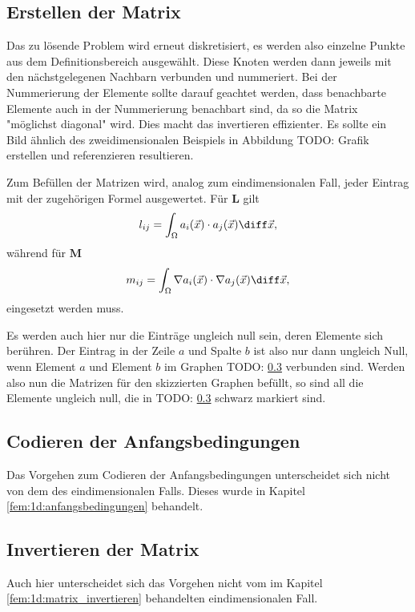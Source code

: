 \subsection{Erstellen der Matrix}
Das zu lösende Problem wird erneut diskretisiert, es werden also einzelne Punkte aus dem Definitionsbereich ausgewählt.
Diese Knoten werden dann jeweils mit den nächstgelegenen Nachbarn verbunden und nummeriert.
Bei der Nummerierung der Elemente sollte darauf geachtet werden, dass benachbarte Elemente auch in der Nummerierung benachbart sind, da so die Matrix "möglichst diagonal" wird.
Dies macht das invertieren effizienter.
Es sollte ein Bild ähnlich des zweidimensionalen Beispiels in Abbildung 
TODO: Grafik erstellen und referenzieren
resultieren.

Zum Befüllen der Matrizen wird, analog zum eindimensionalen Fall, jeder Eintrag mit der zugehörigen Formel ausgewertet.
Für $\mathbf{L}$ gilt
\begin{equation}
    l_{ij} = \int_{\Omega} a_i(\vec{x}) \cdot a_j(\vec{x}) \diff \vec{x},
\end{equation}
während für $\mathbf{M}$ 
\begin{equation}
    m_{ij} = \int_{\Omega} \nabla a_i(\vec{x}) \cdot \nabla a_j(\vec{x}) \diff \vec{x},
\end{equation}
eingesetzt werden muss.

Es werden auch hier nur die Einträge ungleich null sein, deren Elemente sich berühren.
Der Eintrag in der Zeile $a$ und Spalte $b$ ist also nur dann ungleich Null, wenn Element $a$ und Element $b$ im Graphen TODO: \ref{} verbunden sind.
Werden also nun die Matrizen für den skizzierten Graphen befüllt, so sind all die Elemente ungleich null, die in TODO: \ref{} schwarz markiert sind.

\subsection{Codieren der Anfangsbedingungen}
Das Vorgehen zum Codieren der Anfangsbedingungen unterscheidet sich nicht von dem des eindimensionalen Falls. 
Dieses wurde in Kapitel \ref{fem:1d:anfangsbedingungen} behandelt.

\subsection{Invertieren der Matrix}
Auch hier unterscheidet sich das Vorgehen nicht vom im Kapitel \ref{fem:1d:matrix_invertieren} behandelten eindimensionalen Fall.